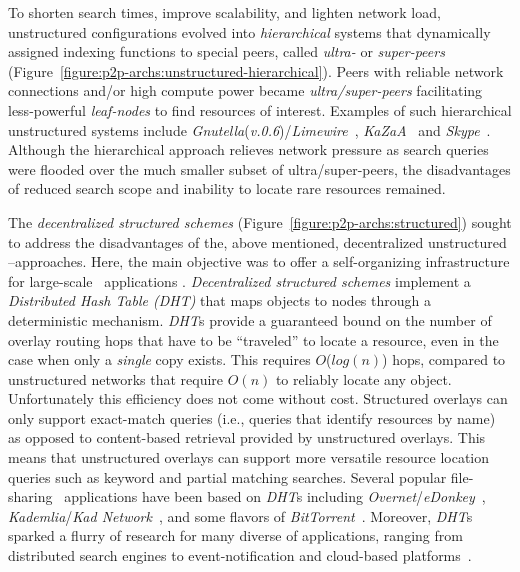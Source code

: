 
To shorten search times, improve scalability, and lighten network load, 
unstructured configurations evolved into \emph{hierarchical} systems 
that dynamically assigned indexing functions to special peers, 
called \emph{ultra-}  or \emph{super-peers} 
(Figure~\ref{figure:p2p-archs:unstructured-hierarchical}). 
Peers with reliable network connections and/or high compute power 
became \emph{ultra/super-peers}
facilitating less-powerful \emph{leaf-nodes} to find resources of
interest. 
Examples of such hierarchical unstructured systems include
{\sl Gnutella}(\emph{v.0.6})/{\sl Limewire}~\cite{gnutella}, 
{\sl KaZaA}~\cite{kazaa} and {\sl Skype}~\cite{skype}. 
Although the hierarchical approach relieves network pressure as
search queries were flooded over the much smaller subset of 
ultra/super-peers, the disadvantages of reduced search scope and 
inability to locate rare resources remained.

The \emph{decentralized structured schemes}
(Figure~\ref{figure:p2p-archs:structured}) sought to address the 
disadvantages of the, above mentioned, decentralized unstructured
\p--approaches. Here, the main objective was to offer 
a self-organizing infrastructure for large-scale \p\ applications
\cite{ratnasamy_can_2001,stoica_chord_2001,antony_pastry_2001,zhao_tapestry_2001,maymounkov_kademlia_2002,rgrk_bamboo_2004}.
\emph{Decentralized structured schemes}
implement a \emph{Distributed Hash Table (DHT)} that maps objects 
to nodes through a deterministic mechanism. 
\emph{DHT}s provide a guaranteed bound on the
number of overlay routing hops that have to be ``traveled''
to locate a resource, even in the case when only a \emph{single} copy exists.  
This requires
$O$($log(n)$) hops, compared to unstructured networks that require
$O(n)$ to reliably locate any object. 
Unfortunately this efficiency does not come without cost. 
Structured overlays can only support exact-match queries 
(i.e., queries that identify resources by name) as opposed
to content-based retrieval provided by unstructured overlays. 
This means that unstructured overlays can support more versatile 
resource location queries such as keyword and partial matching searches. 
Several popular file-sharing
\p\ applications have been based on \emph{DHT}s including
{\sl Overnet}/{\sl eDonkey}~\cite{overnet}, 
{\sl Kademlia}/{\sl Kad Network}~\cite{maymounkov_kademlia_2002}, and
some flavors of {\sl BitTorrent}~\cite{c_bittorrent_2003}.  
Moreover, \emph{DHT}s sparked
a flurry of research for many diverse of applications, ranging
from distributed search engines to event-notification and cloud-based
platforms~\cite{kbc_oceanstore_2000,rkcd_scribe_2001,mgpj_cloudsnap_2011}.

